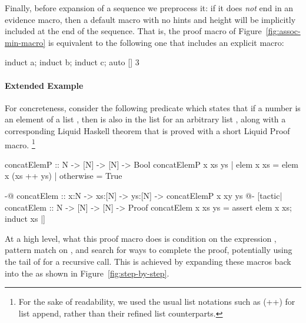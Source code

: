 Finally, before expansion of a sequence we preprocess it: if it does
{\em not} end in an evidence macro, then a default  macro
with no hints and height  will be implicitly included at the end
of the sequence. That is, the proof macro of
Figure~\ref{fig:assoc-min-macro} is equivalent to the following one
that includes an explicit  macro:
\begin{code}
  induct a; induct b; induct c; auto [] 3
\end{code}

\paragraph{Extended Example}

For concreteness, consider the following predicate which states that
if a number  is an element of a list , then  is
also in the list  for an arbitrary list , along
with a corresponding Liquid Haskell theorem that is proved with a short
Liquid Proof macro.
\footnote{For the sake of readability, we used the usual list
  notations such as (++) for list append, rather than their refined
  list counterparts.}%
%
\begin{code}
  concatElemP :: N -> [N] -> [N] -> Bool
  concatElemP x xs ys
    | elem x xs = elem x (xs ++ ys)
    | otherwise = True

  {-@ concatElem :: x:N -> xs:[N] -> ys:[N] ->
      {concatElemP x xy ys} @-}
  [tactic|
  concatElem :: N -> [N] -> [N] -> Proof
  concatElem x xs ys =
    assert {elem x xs};
    induct xs
  |]
\end{code}

At a high level, what this proof macro does is condition on the
expression , pattern match on , and search for
ways to complete the proof, potentially using the tail of  for
a recursive call. This is achieved by expanding these macros back into
the \LangB as shown in Figure~\ref{fig:step-by-step}.

